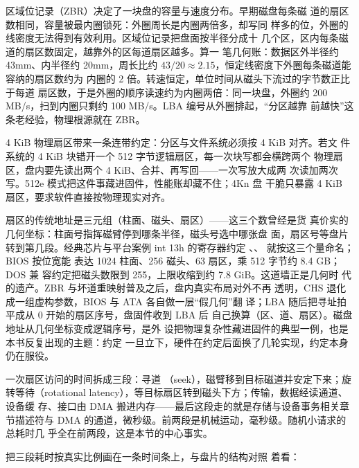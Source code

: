 区域位记录（ZBR）决定了一块盘的容量与速度分布。早期磁盘每条磁
道的扇区数相同，容量被最内圈锁死：外圈周长是内圈两倍多，却写同
样多的位，外圈的线密度无法得到有效利用。区域位记录把盘面按半径分成十
几个区，区内每条磁道的扇区数固定，越靠外的区每道扇区越多。算一
笔几何账：数据区外半径约 43mm、内半径约 20mm，周长比约
$43/20\approx2.15$，恒定线密度下外圈每条磁道能容纳的扇区数约为
内圈的 2 倍。转速恒定，单位时间从磁头下流过的字节数正比于每道
扇区数，于是外圈的顺序读速约为内圈两倍：同一块盘，外圈约
200 MB/s，扫到内圈只剩约 100 MB/s。LBA 编号从外圈排起，“分区越靠
前越快”这条老经验，物理根源就在 ZBR。

4 KiB 物理扇区带来一条连带约定：分区与文件系统必须按 4 KiB 对齐。若文
件系统的 4 KiB 块错开一个 512 字节逻辑扇区，每一次块写都会横跨两个
物理扇区，盘内要先读出两个 4 KiB、合并、再写回——一次写放大成两
次读加两次写。512e 模式把这件事藏进固件，性能账却藏不住；4Kn 盘
干脆只暴露 4 KiB 扇区，要求软件直接按物理现实对齐。

扇区的传统地址是三元组（柱面、磁头、扇区）——这三个数曾经是货
真价实的几何坐标：柱面号指挥磁臂停到哪条半径，磁头号选中哪张盘
面，扇区号等盘片转到第几段。经典芯片与平台案例 int 13h 的寄存器约定
、、 就按这三个量命名；BIOS 按位宽能
表达 1024 柱面、256 磁头、63 扇区，乘 512 字节约 8.4 GB；DOS 兼
容约定把磁头数限到 255，上限收缩到约 7.8 GiB。这道墙正是几何时
代的遗产。ZBR 与坏道重映射普及之后，盘内真实布局对外不再
透明，CHS 退化成一组虚构参数，BIOS 与 ATA 各自做一层“假几何”翻
译；LBA 随后把寻址拍平成从 0 开始的扇区序号，盘固件收到 LBA 后
自己换算（区、道、扇区）。磁盘地址从几何坐标变成逻辑序号，是外
设把物理复杂性藏进固件的典型一例，也是本书反复出现的主题：约定
一旦立下，硬件在约定后面换了几轮实现，约定本身仍在服役。

一次扇区访问的时间拆成三段：寻道
（seek），磁臂移到目标磁道并安定下来；旋转等待（rotational
latency），等目标扇区转到磁头下方；传输，数据经读通道、设备缓
存、接口由 DMA 搬进内存——最后这段走的就是存储与设备事务相关章节描述符与 DMA
的通道，微秒级。前两段是机械运动，毫秒级。随机小请求的总耗时几
乎全在前两段，这是本节的中心事实。

把三段耗时按真实比例画在一条时间条上，与盘片的结构对照
着看：

